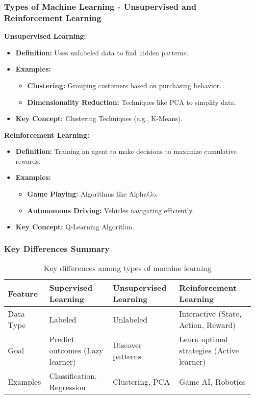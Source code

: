 \documentclass[aspectratio=169]{beamer}
\begin{document}
\begin{frame}[fragile]
    \frametitle{Types of Machine Learning - Unsupervised and Reinforcement Learning}
    \textbf{Unsupervised Learning:}
    \begin{itemize}
        \item \textbf{Definition:} Uses unlabeled data to find hidden patterns.
        
        \item \textbf{Examples:}
        \begin{itemize}
            \item \textbf{Clustering:} Grouping customers based on purchasing behavior.
            \item \textbf{Dimensionality Reduction:} Techniques like PCA to simplify data.
        \end{itemize} 
        
        \item \textbf{Key Concept:} Clustering Techniques (e.g., K-Means).
    \end{itemize}
    
    \vspace{0.5cm}

    \textbf{Reinforcement Learning:}
    \begin{itemize}
        \item \textbf{Definition:} Training an agent to make decisions to maximize cumulative rewards.
        
        \item \textbf{Examples:}
        \begin{itemize}
            \item \textbf{Game Playing:} Algorithms like AlphaGo.
            \item \textbf{Autonomous Driving:} Vehicles navigating efficiently.
        \end{itemize} 
        
        \item \textbf{Key Concept:} Q-Learning Algorithm.
    \end{itemize}
\end{frame}

\begin{frame}[fragile]
    \frametitle{Key Differences Summary}
    \begin{table}[ht]
        \centering
        \begin{tabular}{|l|l|l|l|}
        \hline
        \textbf{Feature} & \textbf{Supervised Learning} & \textbf{Unsupervised Learning} & \textbf{Reinforcement Learning} \\ \hline
        Data Type & Labeled & Unlabeled & Interactive (State, Action, Reward) \\ \hline
        Goal & Predict outcomes (Lazy learner) & Discover patterns & Learn optimal strategies (Active learner) \\ \hline
        Examples & Classification, Regression & Clustering, PCA & Game AI, Robotics \\ \hline
        \end{tabular}
        \caption{Key differences among types of machine learning}
    \end{table}
\end{frame}
\end{document}
